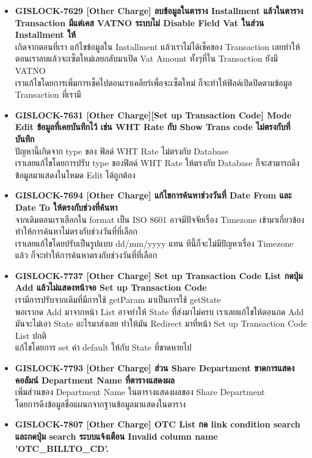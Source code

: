 \begin{itemize}
    \item \textbf{{GISLOCK-7629 [Other Charge] ลบข้อมูลในตาราง Installment แล้วในตาราง Transaction มีแต่เคส VATNO ระบบไม่ Disable Field Vat ในส่วน Installment ให้}} \\
        เกิดจากตอนที่เรา แก้ไขข้อมูลใน Installment แล้วเราไม่ได้เช็คของ Transaction เลยทำให้ตอนเราลบแล้วจะเซ็ตใหม่เลยกลับมาเปิด Vat Amount ทั้งๆที่ใน Transaction ยังมี VATNO \\
        เราแก้ไขโดยการเพิ่มการเช็คไปตอนเราเคลียร์เพื่อจะเซ็ตใหม่ ก็จะทำให้ฟิลด์เปิดปิดตามข้อมูล Transaction ที่เรามี
    \item \textbf{{GISLOCK-7631 [Other Charge][Set up Transaction Code] Mode Edit ข้อมูลที่เคยบันทึกไว้ เช่น WHT Rate กับ Show Trans code ไม่ตรงกับที่บันทึก}} \\
        ปัญหานี้เกิดจาก type ของ ฟิลด์ WHT Rate ไม่ตรงกับ Database \\
        เราเลยแก้ไขโดยการปรับ type ของฟิลด์ WHT Rate ให้ตรงกับ Database ก็จะสามารถดึงข้อมูลมาแสดงในโหมด Edit ได้ถูกต้อง
    \item \textbf{{GISLOCK-7694 [Other Charge] แก้ไขการค้นหาช่วงวันที่ Date From และ Date To ให้ตรงกับช่วงที่ค้นหา}} \\
        จากเดิมตอนเราเลือกใน format เป็น ISO 8601 อาจมีปัจจัยเรื่อง Timezone เข้ามาเกี่ยวข้องทำให้การค้นหาไม่ตรงกับช่วงวันที่ที่เลือก \\
        เราเลยแก้ไขโดยปรับเป็นรูปแบบ dd/mm/yyyy แทน ทีนี้ก็จะไม่มีปัญหาเรื่อง Timezone แล้ว ก็จะทำให้การค้นหาตรงกับช่วงวันที่ที่เลือก
    \item \textbf{{GISLOCK-7737 [Other Charge] Set up Transaction Code List กดปุ่ม Add แล้วไม่แสดงหน้าจอ Set up Transaction Code}} \\
        เรามีการปรับจากเดิมที่มีการใช้ getParam มาเป็นการใช้ getState \\
        พอเรากด Add มาจากหน้า List อาจทำให้ State ที่ส่งมาไม่ครบ เราเลยแก้ไขให้ตอนกด Add มันจะไม่เอา State อะไรมาส่งเลย ทำให้มัน Redirect มาที่หน้า Set up Transaction Code List ปกติ \\
        แก้ไขโดยการ set ค่า default ให้กับ State ที่ขาดหายไป 
    \item \textbf{{GISLOCK-7793 [Other Charge] ส่วน Share Department ขาดการแสดงคอลัมน์ Department Name ที่ตารางแสดงผล}} \\
        เพิ่มส่วนของ Department Name ในตารางแสดงผลของ Share Department \\
        โดยการดึงข้อมูลชื่อแผนกจากฐานข้อมูลมาแสดงในตาราง
    \item \textbf{{GISLOCK-7807 [Other Charge] OTC List กด link condition search และกดปุ่ม search ระบบแจ้งเตือน Invalid column name 'OTC\_BILLTO\_CD'.}} \\

\end{itemize}

